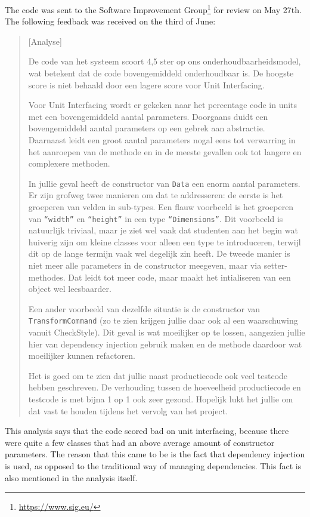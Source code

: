 The code was sent to the Software Improvement
Group\footnote{\url{https://www.sig.eu/}} for review on May 27th. The following
feedback was received on the third of June:

\begin{quotation}
[Analyse]

De code van het systeem scoort 4,5 ster op ons onderhoudbaarheidsmodel, wat
betekent dat de code bovengemiddeld onderhoudbaar is. De hoogste score is niet
behaald door een lagere score voor Unit Interfacing.

Voor Unit Interfacing wordt er gekeken naar het percentage code in units met een
bovengemiddeld aantal parameters. Doorgaans duidt een bovengemiddeld aantal
parameters op een gebrek aan abstractie. Daarnaast leidt een groot aantal
parameters nogal eens tot verwarring in het aanroepen van de methode en in de
meeste gevallen ook tot langere en complexere methoden.

In jullie geval heeft de constructor van \texttt{Data} een enorm aantal
parameters. Er zijn grofweg twee manieren om dat te addresseren: de eerste is
het groeperen van velden in sub-types. Een flauw voorbeeld is het groeperen van
\texttt{``width''} en \texttt{``height''} in een type \texttt{``Dimensions''}.
Dit voorbeeld is natuurlijk triviaal, maar je ziet wel vaak dat studenten aan
het begin wat huiverig zijn om kleine classes voor alleen een type te
introduceren, terwijl dit op de lange termijn vaak wel degelijk zin heeft. De
tweede manier is niet meer alle parameters in de constructor meegeven, maar via
setter-methodes. Dat leidt tot meer code, maar maakt het intialiseren van een
object wel leesbaarder.

Een ander voorbeeld van dezelfde situatie is de constructor van
\texttt{TransformCommand} (zo te zien krijgen jullie daar ook al een
waarschuwing vanuit CheckStyle). Dit geval is wat moeilijker op te lossen,
aangezien jullie hier van dependency injection gebruik maken en de methode
daardoor wat moeilijker kunnen refactoren.

Het is goed om te zien dat jullie naast productiecode ook veel testcode hebben
geschreven. De verhouding tussen de hoeveelheid productiecode en testcode is met
bijna 1 op 1 ook zeer gezond. Hopelijk lukt het jullie om dat vast te houden
tijdens het vervolg van het project.
\end{quotation}

This analysis says that the code scored bad on unit interfacing, because there
were quite a few classes that had an above average amount of constructor
parameters. The reason that this came to be is the fact that dependency
injection is used, as opposed to the traditional way of managing dependencies.
This fact is also mentioned in the analysis itself.


